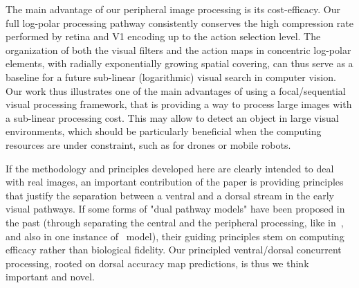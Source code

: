 The main advantage of our peripheral image processing is its cost-efficacy. Our full log-polar processing pathway consistently conserves the high compression rate performed by retina and V1 encoding up to the action selection level. The organization of both the visual filters and the action maps in concentric log-polar elements, with radially exponentially growing spatial covering, can thus serve as a baseline for a future sub-linear (logarithmic) visual search in computer vision. Our work thus illustrates one of the main advantages of using a focal/sequential visual processing framework, that is providing a way to process large images with a sub-linear processing cost.
This may allow to detect an object in large visual environments, which should be particularly beneficial when the computing resources are under constraint, such as for drones or mobile robots.

If the methodology and principles developed here are clearly intended to deal with real images, an important contribution of the paper is providing principles that justify the separation between a ventral and a dorsal stream in the early visual pathways. If some forms of "dual pathway models" have been proposed in the past (through separating the central and the peripheral processing, like in~\cite{denil2012learning}, and also in one instance of~\cite{akbas2017object} model), their guiding principles stem on computing efficacy rather than biological fidelity. Our principled ventral/dorsal concurrent processing, rooted on dorsal accuracy map predictions, is thus we think important and novel.

